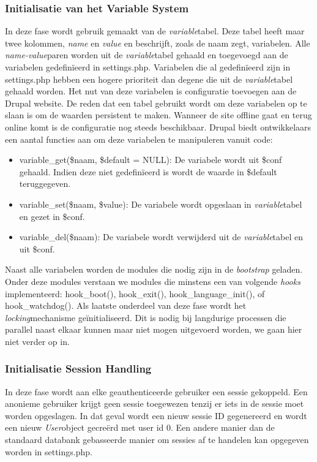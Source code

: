 \subsubsection{Initialisatie van het Variable System}
In deze fase wordt gebruik gemaakt van de \textit{variable}tabel. Deze tabel heeft maar twee kolommen, \textit{name} en \textit{value} en beschrijft, zoals de naam zegt, variabelen. Alle \textit{name-value}paren worden uit de \textit{variable}tabel gehaald en toegevoegd aan de variabelen gedefin\"{i}eerd in settings.php. Variabelen die al gedefin\"{i}eerd zijn in settings.php hebben een hogere prioriteit dan degene die uit de \textit{variable}tabel gehaald worden. Het nut van deze variabelen is configuratie toevoegen aan de Drupal website. De reden dat een tabel gebruikt wordt om deze variabelen op te slaan is om de waarden persistent te maken. Wanneer de site offline gaat en terug online komt is de configuratie nog steeds beschikbaar. Drupal biedt ontwikkelaars een aantal functies aan om deze variabelen te manipuleren vanuit code:
\begin{itemize}
\item variable\_get(\$naam, \$default = NULL): De variabele wordt uit \$conf gehaald. Indien deze niet gedefin\"{i}eerd is wordt de waarde in \$default teruggegeven.
\item variable\_set(\$naam, \$value): De variabele wordt opgeslaan in \textit{variable}tabel en gezet in \$conf.
\item variable\_del(\$naam): De variabele wordt verwijderd uit de \textit{variable}tabel en uit \$conf.
\end{itemize}

\noindent
Naast alle variabelen worden de modules die nodig zijn in de \textit{bootstrap} geladen. Onder deze modules verstaan we modules die minstens een van volgende \textit{hooks} implementeerd: hook\_boot(), hook\_exit(), hook\_language\_init(), of hook\_watchdog(). Als laatste onderdeel van deze fase wordt het \textit{locking}mechanisme ge\"{i}nitialiseerd. Dit is nodig bij langdurige processen die parallel naast elkaar kunnen maar niet mogen uitgevoerd worden, we gaan hier niet verder op in.

\subsubsection{Initialisatie Session Handling}
In deze fase wordt aan elke geauthenticeerde gebruiker een sessie gekoppeld. Een anonieme gebruiker krijgt geen sessie toegewezen tenzij er iets in de sessie moet worden opgeslagen. In dat geval wordt een nieuw sessie ID gegenereerd en wordt een nieuw \textit{User}object gecre\"{e}rd met user id 0. Een andere manier dan de standaard databank gebasseerde manier om sessies af te handelen kan opgegeven worden in settings.php.

